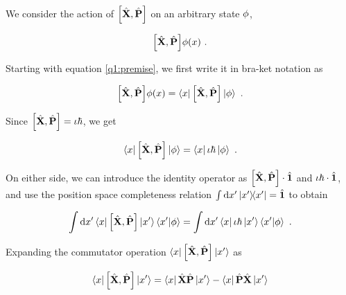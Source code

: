 
We consider the action of $\commutator{\Position}{\Momentum}$ 
on an arbitrary state $\phi$, 

\begin{equation}
    \commutator{\Position}{\Momentum} \statephi(\position)~.
    \label{q1:premise}
\end{equation}

Starting with equation \ref{q1:premise}, we first write it in
bra-ket notation as

\begin{equation}
    \commutator{\Position}{\Momentum} \statephi(\position) = 
        \bra{\position} \commutator{\Position}{\Momentum} \ket{\statephi}~.
\end{equation}

Since $\commutator{\Position}{\Momentum} = \iota \hbar$, we get

\begin{equation}
    \bra{\position} \commutator{\Position}{\Momentum} \ket{\statephi} =
        \bra{\position} \iota \hbar \ket{\statephi}~.
\end{equation}

On either side, we can introduce the identity operator as 
$\commutator{\Position}{\Momentum} \cdot \Identity$ and 
$\iota \hbar \cdot \hat{\textbf{1}}$, and use the 
position space completeness relation $\int 
\dd{x'} \ketbra{x'}{x'} = \hat{\textbf{1}}$ to obtain

\begin{equation}
    \int \dd{\position'} \bra{\position}\commutator{\Position}{\Momentum}
    \ket{\position'}\braket{\position'}{\statephi} =
    \int \dd{\position'} \bra{\position}\iota \hbar
    \ket{\position'}\braket{\position'}{\statephi}~.
\end{equation}

Expanding the commutator operation $\bra{\position}
\commutator{\Position}{\Momentum}\ket{\position'}$ as

\begin{equation}
    \bra{\position}\commutator{\Position}{\Momentum}\ket{\position'}
    = \bra{\position}\Position\Momentum\ket{\position'} - 
        \bra{\position}\Momentum\Position\ket{\position'} 
    \nonumber
\end{equation}

